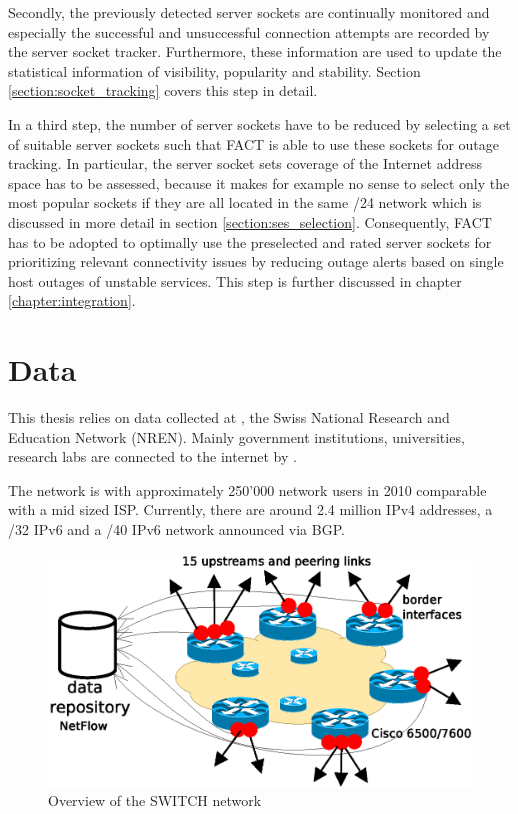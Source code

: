 Secondly, the previously detected server sockets are continually monitored and
especially the successful and unsuccessful connection attempts are recorded by
the server socket tracker.
Furthermore, these information are used to update the statistical information of
visibility, popularity and stability. Section \ref{section:socket_tracking}
covers this step in detail.

In a third step, the number of server sockets have to be reduced by selecting a 
set of suitable server sockets such that FACT is able to use these sockets for 
outage tracking. In particular, the server socket sets coverage of the Internet 
address space has to be assessed, because it makes for example no sense to 
select only the most popular sockets if they are all located in the same /24 
network which is discussed in more detail in section \ref{section:ses_selection}. Consequently, FACT has to be adopted to optimally use the preselected 
and rated server sockets for prioritizing relevant connectivity issues by 
reducing outage alerts based on single host outages of unstable services. This step is further discussed in chapter \ref{chapter:integration}.

\section{Data
\label{section:data}}

This thesis relies on data collected at \citet{switch}, the Swiss National 
Research and Education Network (NREN). Mainly government institutions, 
universities, research labs are connected to the internet by \citet{switch}\citep{Schatzmann:Mining}.

The \citet{switch} network is with approximately 250'000 network users in 2010 comparable with a mid sized ISP. Currently, there are around 2.4 million IPv4 addresses, a /32 IPv6 and a /40 IPv6 network announced via BGP\citep{Schatzmann:Tracing}.

\begin{figure}[h] 
	\centering
	\includegraphics[width=12cm]{images/network_overview.eps}
	\caption{Overview of the SWITCH network \citep{SchatzmanThesis2012}} 
	\label{fig:switch_nework}
\end{figure}

